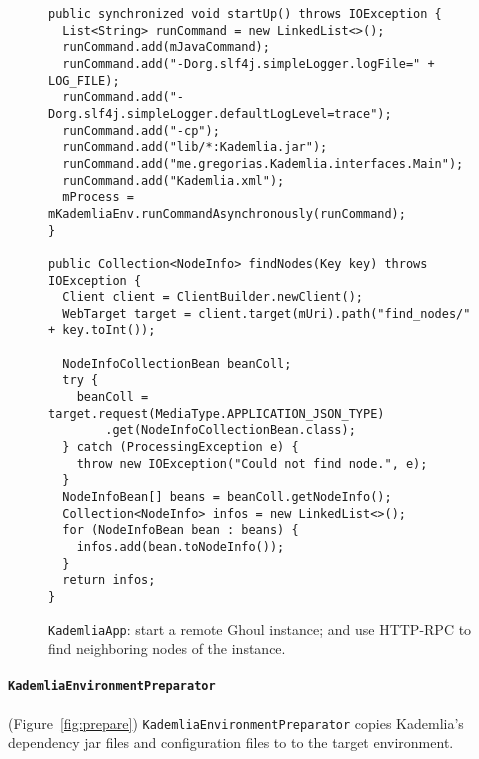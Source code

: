 \begin{figure}[tbp]
\begin{lstlisting}
public synchronized void startUp() throws IOException {
  List<String> runCommand = new LinkedList<>();
  runCommand.add(mJavaCommand);
  runCommand.add("-Dorg.slf4j.simpleLogger.logFile=" + LOG_FILE);
  runCommand.add("-Dorg.slf4j.simpleLogger.defaultLogLevel=trace");
  runCommand.add("-cp");
  runCommand.add("lib/*:Kademlia.jar");
  runCommand.add("me.gregorias.Kademlia.interfaces.Main");
  runCommand.add("Kademlia.xml");
  mProcess = mKademliaEnv.runCommandAsynchronously(runCommand);
}

public Collection<NodeInfo> findNodes(Key key) throws IOException {
  Client client = ClientBuilder.newClient();
  WebTarget target = client.target(mUri).path("find_nodes/" + key.toInt());

  NodeInfoCollectionBean beanColl;
  try {
    beanColl = target.request(MediaType.APPLICATION_JSON_TYPE)
        .get(NodeInfoCollectionBean.class);
  } catch (ProcessingException e) {
    throw new IOException("Could not find node.", e);
  }
  NodeInfoBean[] beans = beanColl.getNodeInfo();
  Collection<NodeInfo> infos = new LinkedList<>();
  for (NodeInfoBean bean : beans) {
    infos.add(bean.toNodeInfo());
  }
  return infos;
}
\end{lstlisting}
\caption{\texttt{KademliaApp}: start a remote Ghoul instance; and use
HTTP-RPC to find neighboring nodes of the instance.}
\label{fig:app_example}
\end{figure}

\paragraph{\texttt{KademliaEnvironmentPreparator}} (Figure~\ref{fig:prepare})
\texttt{KademliaEnvironmentPreparator} copies Kademlia's dependency jar files and configuration
files to to the target environment.

